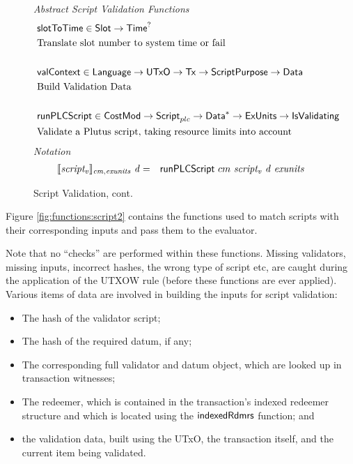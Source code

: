 \begin{figure*}[htb]
  \emph{Abstract Script Validation Functions}
  \begin{align*}
     &\mathsf{slotToTime} \in \mathsf{Slot} \to \mathsf{Time}^? \\
     &\text{Translate slot number to system time or fail} \\~\\
     &\mathsf{valContext} \in \mathsf{Language} \to \mathsf{UTxO} \to \mathsf{Tx} \to \mathsf{ScriptPurpose} \to \mathsf{Data} \\
     &\text{Build Validation Data} \\~\\
     &\mathsf{runPLCScript} \in \mathsf{CostMod} \to\mathsf{Script}_{plc} \to
    \mathsf{Data}^{*} \to \mathsf{ExUnits} \to \mathsf{IsValidating} \\
     &\text{Validate a Plutus script, taking resource limits into account}
  \end{align*}
  \emph{Notation}
  \begin{align*}
    \llbracket \mathit{script_v} \rrbracket_{\mathit{cm},\mathit{exunits}}~\mathit{d}
    &=& \mathsf{runPLCScript} ~{cm}~\mathit{script_v}~\mathit{d}~\mathit{exunits}
  \end{align*}
  \caption{Script Validation, cont.}
  \label{fig:defs:functions-valid}
\end{figure*}

Figure \ref{fig:functions:script2} contains the functions used to
match scripts with their corresponding inputs and pass them to the
evaluator.

Note that no ``checks'' are performed within these functions.
Missing validators, missing inputs, incorrect hashes, the wrong type of script etc,
are caught during the application of the UTXOW rule (before these functions are ever applied).
%
Various items of data are involved in building the inputs for script validation:

\begin{itemize}
\item The hash of the validator script;

\item The hash of the required datum, if any;

\item The corresponding full validator and datum object, which are looked up in transaction witnesses;

\item The redeemer, which is contained in the transaction's indexed redeemer structure
and which is located using the $\mathsf{indexedRdmrs}$ function; and

\item the validation data, built using the UTxO, the transaction itself,
and the current item being validated.
\end{itemize}


